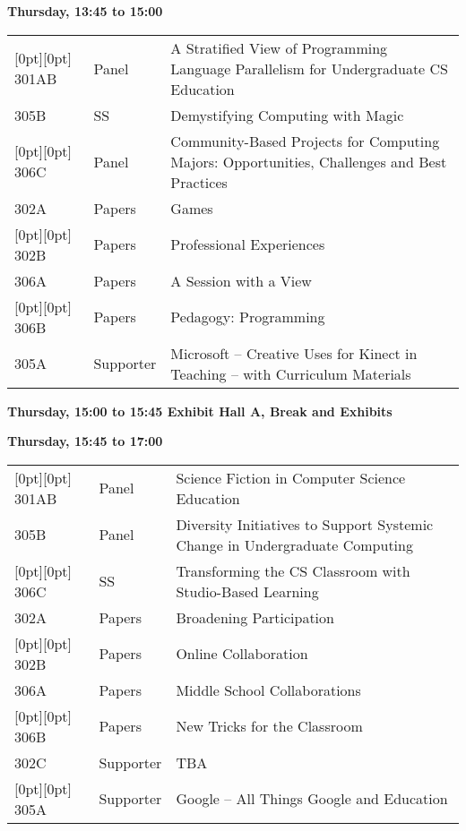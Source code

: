 \noindent
{\sffamily\bfseries Thursday, 13:45 to 15:00}\newline\noindent
\begin{tabular*}{5in}{@{}p{0.5in}@{}p{0.75in}@{}p{3.75in}}

\rowcolor[gray]{0.9}[0pt][0pt] 301AB & Panel & A Stratified View of Programming Language Parallelism for Undergraduate CS Education \\

305B & SS & Demystifying Computing with Magic \\

\rowcolor[gray]{0.9}[0pt][0pt] 306C & Panel & Community-Based Projects for Computing Majors:  Opportunities, Challenges and Best Practices \\

302A & Papers & Games \\

\rowcolor[gray]{0.9}[0pt][0pt] 302B & Papers & Professional Experiences \\

306A & Papers & A Session with a View \\

\rowcolor[gray]{0.9}[0pt][0pt] 306B & Papers & Pedagogy:  Programming \\

305A & Supporter & Microsoft -- Creative Uses for Kinect in Teaching – with Curriculum Materials 
\end{tabular*}
{\sffamily\bfseries Thursday, 15:00 to 15:45 Exhibit Hall A, Break and Exhibits}\newline\noindent

\noindent
{\sffamily\bfseries Thursday, 15:45 to 17:00}\newline\noindent
\begin{tabular*}{5in}{@{}p{0.5in}@{}p{0.75in}@{}p{3.75in}}

\rowcolor[gray]{0.9}[0pt][0pt] 301AB & Panel & Science Fiction in Computer Science Education \\

305B & Panel & Diversity Initiatives to Support Systemic Change in Undergraduate Computing \\

\rowcolor[gray]{0.9}[0pt][0pt] 306C & SS & Transforming the CS Classroom with Studio-Based Learning \\

302A & Papers & Broadening Participation \\

\rowcolor[gray]{0.9}[0pt][0pt] 302B & Papers & Online Collaboration \\

306A & Papers & Middle School Collaborations \\

\rowcolor[gray]{0.9}[0pt][0pt] 306B & Papers & New Tricks for the Classroom \\

302C & Supporter & TBA \\

\rowcolor[gray]{0.9}[0pt][0pt] 305A & Supporter & Google -- All Things Google and Education 
\end{tabular*} \newline

